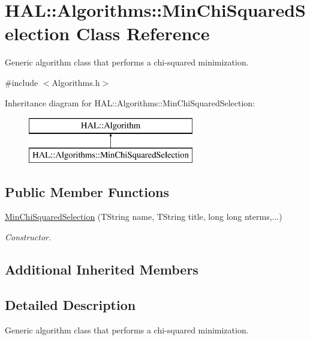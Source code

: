 \hypertarget{class_h_a_l_1_1_algorithms_1_1_min_chi_squared_selection}{\section{H\+A\+L\+:\+:Algorithms\+:\+:Min\+Chi\+Squared\+Selection Class Reference}
\label{class_h_a_l_1_1_algorithms_1_1_min_chi_squared_selection}
}


Generic algorithm class that performs a chi-\/squared minimization.  




{\ttfamily \#include $<$Algorithms.\+h$>$}

Inheritance diagram for H\+A\+L\+:\+:Algorithms\+:\+:Min\+Chi\+Squared\+Selection\+:\begin{figure}[H]
\begin{center}
\leavevmode
\includegraphics[height=2.000000cm]{class_h_a_l_1_1_algorithms_1_1_min_chi_squared_selection}
\end{center}
\end{figure}
\subsection*{Public Member Functions}
\begin{DoxyCompactItemize}
\item 
\hyperlink{class_h_a_l_1_1_algorithms_1_1_min_chi_squared_selection_a35bb157bbc031560febdbd377d94f429}{Min\+Chi\+Squared\+Selection} (T\+String name, T\+String title, long long nterms,...)
\begin{DoxyCompactList}\small\item\em Constructor. \end{DoxyCompactList}\end{DoxyCompactItemize}
\subsection*{Additional Inherited Members}


\subsection{Detailed Description}
Generic algorithm class that performs a chi-\/squared minimization. 

